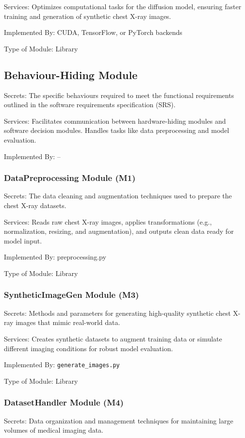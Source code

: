 \documentclass[12pt, titlepage]{article}
\begin{document}
Services: Optimizes computational tasks for the diffusion model, ensuring faster training and generation of synthetic chest X-ray images.

Implemented By: CUDA, TensorFlow, or PyTorch backends

Type of Module: Library


\subsection{Behaviour-Hiding Module}
Secrets: The specific behaviours required to meet the functional requirements outlined in the software requirements specification (SRS).

Services: Facilitates communication between hardware-hiding modules and software decision modules. 
Handles tasks like data preprocessing and model evaluation.

Implemented By: --

\subsubsection{DataPreprocessing Module (M1)}
Secrets: The data cleaning and augmentation techniques used to prepare the chest X-ray datasets.

Services: Reads raw chest X-ray images, applies transformations (e.g., normalization, resizing, and augmentation), and outputs clean data ready for model input.

Implemented By: preprocessing.py

Type of Module: Library

\subsubsection{SyntheticImageGen Module (M3)}
Secrets: Methods and parameters for generating high-quality synthetic chest X-ray images that mimic real-world data.

Services: Creates synthetic datasets to augment training data or simulate different imaging conditions for robust model evaluation.

Implemented By: \verb|generate_images.py|

Type of Module: Library

\subsubsection{DatasetHandler Module (M4)}
Secrets: Data organization and management techniques for maintaining large volumes of medical imaging data.
\end{document}
